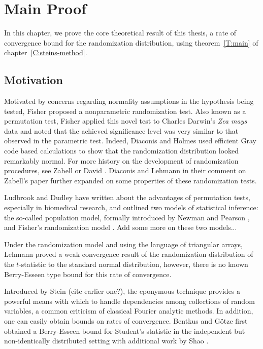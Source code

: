 \chapter{Main Proof}
\label{C:stein-proof}
In this chapter, we prove the core theoretical result of this thesis, a rate of convergence bound for
the randomization distribution, using theorem~\ref{T:main} of chapter~\ref{C:steins-method}.

\section{Motivation}
Motivated by concerns regarding normality assumptions in the hypothesis being tested, Fisher
\cite{fisher1935design} proposed a nonparametric randomization test.  Also known as a permutation
test, Fisher applied this novel test to Charles Darwin's \emph{Zea mays} data and noted that the
achieved significance level was very similar to that observed in the parametric test.  Indeed,
Diaconis and Holmes \cite{diaconis1994gray} used efficient Gray code based calculations to show that
the randomization distribution looked remarkably normal.  For more history on the development of
randomization procedures, see Zabell \cite{zabell2008student} or David \cite{david2008beginnings}.
Diaconis and Lehmann \cite{diaconis2008comment} in their comment on Zabell's paper further expanded
on some properties of these randomization tests.

Ludbrook and Dudley \cite{ludbrook1998permutation} have written about the advantages of permutation
tests, especially in biomedical research, and outlined two models of statistical inference: the
so-called population model, formally introduced by Newman and Pearson \cite{neyman1928use}, and
Fisher's randomization model \cite{fisher1935design}.  Add some more on these two models...

Under the randomization model and using the language of triangular arrays, Lehmann
\cite{lehmann1999elements} proved a weak convergence result of the randomization distribution of the
$t$-statistic to the standard normal distribution, however, there is no known Berry-Esseen type
bound for this rate of convergence.

Introduced by Stein \cite{stein1986approximate} (cite earlier one?), the eponymous technique
provides a powerful means with which to handle dependencies among collections of random variables, a
common criticism of classical Fourier analytic methods.  In addition, one can easily obtain bounds
on rates of convergence.  Bentkus and G{\"o}tze \cite{bentkus1996berry} first obtained a
Berry-Esseen bound for Student's statistic in the independent but non-identically distributed
setting with additional work by Shao \cite{shao2005explicit}.


